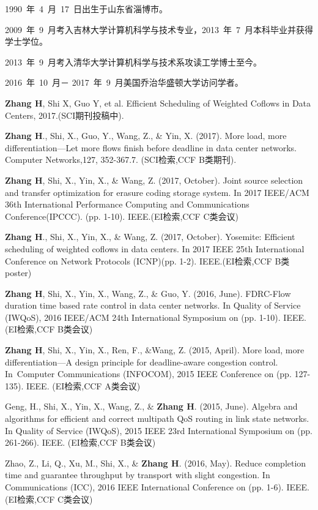 \begin{resume}

  1990~年~4~月~17~日出生于山东省淄博市。

  2009~年~9~月考入吉林大学计算机科学与技术专业，2013~年~7~月本科毕业并获得学士学位。

  2013~年~9~月考入清华大学计算机科学与技术系攻读工学博士至今。
  
  
  2016~年~10~月－  2017~年~9~月美国乔治华盛顿大学访问学者。


  
\begin{enumerate}[{[}1{]}]
\item \textbf{Zhang H}, Shi X, Guo Y, et al. Efficient Scheduling of Weighted Coflows in Data Centers, 2017.(SCI期刊投稿中).
\item \textbf{Zhang H}., Shi, X., Guo, Y., Wang, Z., \& Yin, X. (2017). More load, more differentiation—Let more flows finish before deadline in data center networks. Computer Networks,127, 352-367.7. (SCI检索,CCF B类期刊).
\item \textbf{Zhang H}, Shi, X., Yin, X.,  \& Wang, Z. (2017, October). Joint source selection and transfer optimization for erasure coding storage system. In 2017 IEEE/ACM 36th International Performance Computing and Communications Conference(IPCCC). (pp. 1-10). IEEE.(EI检索,CCF C类会议)
\item \textbf{Zhang H}., Shi, X., Yin, X.,  \& Wang, Z. (2017, October). Yosemite: Efficient scheduling of weighted coflows in data centers. In 2017 IEEE 25th International Conference on Network Protocols (ICNP)(pp. 1-2). IEEE.(EI检索,CCF B类 poster)
\item \textbf{Zhang H}, Shi, X., Yin, X., Wang, Z.,  \& Guo, Y. (2016, June). FDRC-Flow duration time based rate control in data center networks. In Quality of Service (IWQoS), 2016 IEEE/ACM 24th International Symposium on (pp. 1-10). IEEE.(EI检索,CCF B类会议)
\item \textbf{Zhang H}, Shi, X., Yin, X., Ren, F., \&Wang, Z. (2015, April). More load, more differentiation—A design principle for deadline-aware congestion control. In Computer Communications (INFOCOM), 2015 IEEE Conference on (pp. 127-135). IEEE. (EI检索,CCF A类会议)
 \item  Geng, H., Shi, X., Yin, X., Wang, Z., \&  \textbf{Zhang H}. (2015, June). Algebra and algorithms for efficient and correct multipath QoS routing in link state networks. In Quality of Service (IWQoS), 2015 IEEE 23rd International Symposium on (pp. 261-266). IEEE.  (EI检索,CCF B类会议)
\item Zhao, Z., Li, Q., Xu, M., Shi, X.,  \&  \textbf{Zhang H}. (2016, May). Reduce completion time and guarantee throughput by transport with slight congestion. In Communications (ICC), 2016 IEEE International Conference on (pp. 1-6). IEEE.(EI检索,CCF C类会议)
\end{enumerate}



\end{resume}
